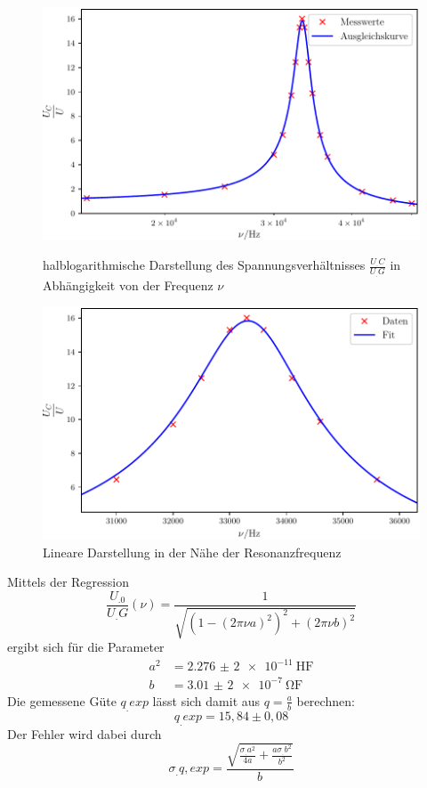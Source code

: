 \begin{figure}
\centering
\includegraphics[scale=0.8]{content/images/Graphc1.pdf}
\caption{halblogarithmische Darstellung des Spannungsverhältnisses $\frac{U_.C}{U_.G}$ in Abhängigkeit von der Frequenz $\nu$}\label{fig:abb2}
\includegraphics[scale=0.8]{content/images/Graphc2.pdf}
\caption{Lineare Darstellung in der Nähe der Resonanzfrequenz}
\label{fig:abb3}
\end{figure}
\newpage
\noindent
Mittels der Regression 
\[
\frac{U_.0}{U_.G}(\nu)=\frac{1}{\sqrt{\left(1-\left(2\pi\nu a\right)^2\right)^2+\left(2\pi\nu b\right)^2}}
\]
ergibt sich für die Parameter
\begin{align*}
a^2&=\SI{2,276(2)e-11}{\henry\farad} \\
b&=\SI{3,01(2)e-7}{\ohm\farad}
\end{align*}
Die gemessene Güte $q_.{exp}$ lässt sich damit aus $q=\frac{a}{b}$ berechnen:
\[
q_.{exp}=15,84\pm 0,08
\]
Der Fehler wird dabei durch
\[
\sigma_.{q,exp}=\frac{\sqrt{\frac{\sigma_.a^2}{4a}+\frac{a\sigma_.b^2}{b^2}}}{b}
\]
